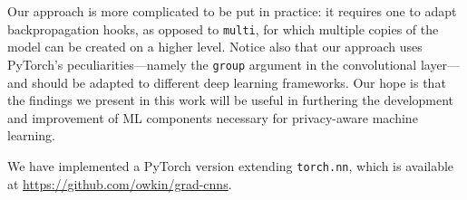 \documentclass[11pt]{article}
\begin{document}
Our approach is more complicated to be put in practice: it requires one to
adapt backpropagation hooks, as opposed to \texttt{multi}, for which
multiple copies of the model can be created on a higher level. Notice also
that our approach uses PyTorch's peculiarities---namely the \texttt{group}
argument in the convolutional layer---and should be adapted to different 
deep learning frameworks. Our hope is that the findings we present in
this work will be useful in furthering the development and improvement
of ML components necessary for privacy-aware machine learning.

We have implemented a PyTorch version extending \texttt{torch.nn}, which is
available at \url{https://github.com/owkin/grad-cnns}.

\printbibliography
\end{document}
